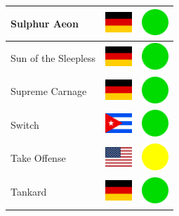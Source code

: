 \documentclass[12pt, a4paper, twoside]{report}
\begin{document}
\begin{center}
\begin{longtable}{|p{5cm}|p{2cm}|p{2cm}|}
 Sulphur Aeon                                               & \includegraphics[width=1cm]{../4x3/de} &   \includegraphics[width=1cm]{../likes/y} \\ \hline
 Sun of the Sleepless                                       & \includegraphics[width=1cm]{../4x3/de} &   \includegraphics[width=1cm]{../likes/y} \\ \hline
 Supreme Carnage                                            & \includegraphics[width=1cm]{../4x3/de} &   \includegraphics[width=1cm]{../likes/y} \\ \hline
 Switch                                                     & \includegraphics[width=1cm]{../4x3/cu} &   \includegraphics[width=1cm]{../likes/y} \\ \hline
 Take Offense                                               & \includegraphics[width=1cm]{../4x3/us} &   \includegraphics[width=1cm]{../likes/m} \\ \hline
 Tankard                                                    & \includegraphics[width=1cm]{../4x3/de} &   \includegraphics[width=1cm]{../likes/y} \\ \hline

\end{longtable}
\end{center}
\end{document}
